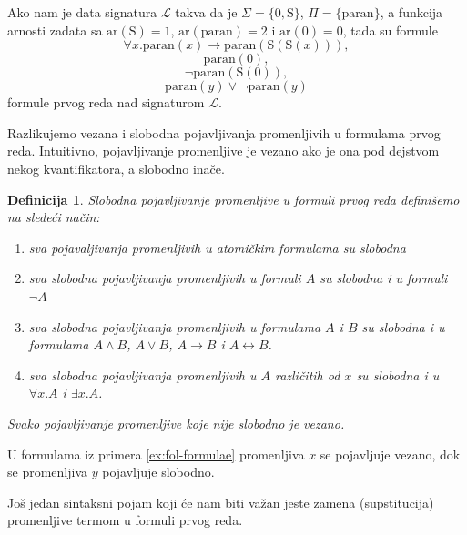 \documentclass[a4paper,10pt]{article}
\newtheorem{definition}{Definicija}[section]
\theoremstyle{remark}
\newenvironment{example}
  {\pushQED{\qed}\renewcommand{\qedsymbol}{$\triangle$}\examplex}
  {\popQED\endexamplex}
\begin{document}
\begin{example}
    \label{ex:fol-formulae}
    Ako nam je data signatura $\mathcal{L}$ takva da je
    $\Sigma = \{0, \mathrm{S}\}$, $\Pi = \{\mathrm{paran}\}$, a funkcija arnosti
    zadata sa $\mathrm{ar}(\mathrm{S}) = 1$, $\mathrm{ar}(\mathrm{paran}) = 2$ i
    $\mathrm{ar}(0) = 0$, tada su formule
    $$\forall x. \mathrm{paran}(x)
    \rightarrow \mathrm{paran}(\mathrm{S}(\mathrm{S}(x))),$$
    $$\mathrm{paran}(0),$$
    $$\neg \mathrm{paran}(\mathrm{S}(0)),$$
    $$\mathrm{paran}(y) \lor \neg\mathrm{paran}(y)$$
    formule prvog reda nad signaturom $\mathcal{L}$.
\end{example}

Razlikujemo vezana i slobodna pojavljivanja promenljivih u formulama prvog
reda.
Intuitivno, pojavljivanje promenljive je vezano ako je ona pod dejstvom nekog
kvantifikatora, a slobodno inače.

\begin{definition}
    Slobodna pojavljivanje promenljive u formuli prvog reda definišemo na
    sledeći način:
    \begin{enumerate}
        \itemsep-0.3em
        \item sva pojavaljivanja promenljivih u atomičkim formulama su slobodna
        \item sva slobodna pojavljivanja promenljivih u formuli $A$ su slobodna
        i u formuli $\neg A$
        \item sva slobodna pojavljivanja promenljivih u formulama $A$ i $B$ su
        slobodna i u formulama $A \land B$, $A \lor B$, $A \rightarrow B$ i
        $A \leftrightarrow B$.
        \item sva slobodna pojavljivanja promenljivih u $A$ različitih od $x$ su
        slobodna i u $\forall x. A$ i $\exists x. A$.
    \end{enumerate}

    Svako pojavljivanje promenljive koje nije slobodno je vezano.
\end{definition}

\begin{example}
    U formulama iz primera \ref{ex:fol-formulae} promenljiva $x$ se pojavljuje
    vezano, dok se promenljiva $y$ pojavljuje slobodno.
\end{example}

Još jedan sintaksni pojam koji će nam biti važan jeste zamena (supstitucija)
promenljive termom u formuli prvog reda.
\end{document}
